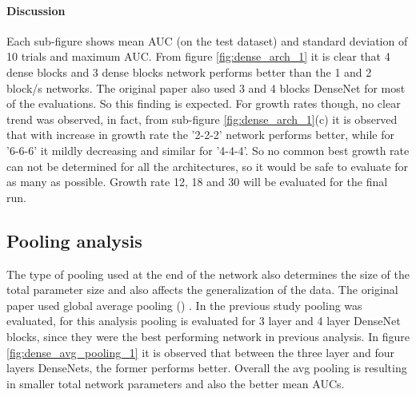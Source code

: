 \paragraph{Discussion\\}
Each sub-figure shows mean AUC (on the test dataset) and standard deviation of 10 trials and maximum AUC. From figure \ref{fig:dense_arch_1} it is clear that 4 dense blocks and 3 dense blocks network performs better
than the 1 and 2 block/s networks. The original paper \cite{densenet} also used 3 and 4 blocks DenseNet for most of the evaluations. So this finding is expected. For growth rates though, no clear trend was observed,
in fact, from sub-figure \ref{fig:dense_arch_1}(c) it is observed that with increase in growth rate the '2-2-2' network performs better, while for '6-6-6' it mildly decreasing and similar for '4-4-4'. So no common best growth rate
can not be determined for all the architectures, so it would be safe to evaluate for as many as possible. Growth rate 12, 18 and 30 will be evaluated for the final run. 

\subsection{Pooling analysis}
The type of pooling used at the end of the network also determines the size of the total parameter size and also affects the generalization of the data. The original paper \cite{densenet} used global average pooling () \cite{lin2013network}. 
In the previous study  pooling was evaluated, for this analysis  pooling is evaluated for 3 layer and 4 layer DenseNet blocks, since they were the best performing network in previous analysis. In figure 
\ref{fig:dense_avg_pooling_1} it is observed that between the three layer and four layers DenseNets, the former performs better. Overall the avg pooling is resulting in smaller total network parameters and also the better mean AUCs.

